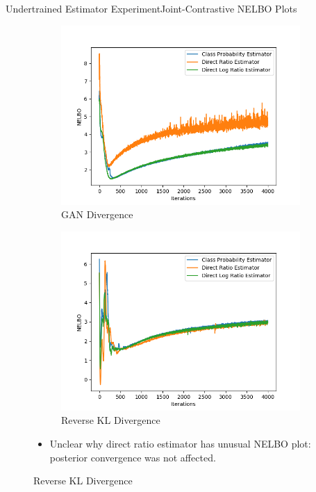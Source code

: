 \documentclass{beamer}
\begin{document}
\begin{frame}{Undertrained Estimator Experiment}{Joint-Contrastive NELBO Plots}
\begin{figure}
\begin{subfigure}{0.49\textwidth}
\includegraphics[width=\linewidth]{part2nelbos/JCADVvsJCADVexpvsJCADVgudlog.png}
\caption{GAN Divergence}
\end{subfigure}
\begin{subfigure}{0.49\textwidth}
\includegraphics[width=\linewidth]{part2nelbos/JCKLDvsJCKLexpvsJCKLgudlog.png}
\caption{Reverse KL Divergence}
\end{subfigure}
\begin{itemize}
\item Unclear why direct ratio estimator has unusual NELBO plot: posterior convergence was not affected.
\end{itemize}
\end{figure}
\end{frame}
\end{document}

